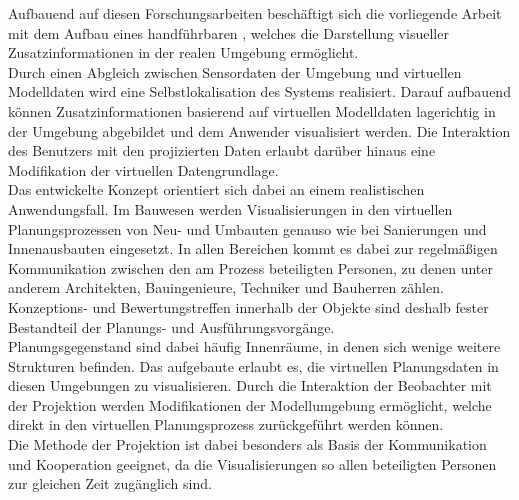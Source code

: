Aufbauend auf diesen Forschungsarbeiten beschäftigt sich die vorliegende Arbeit mit dem Aufbau eines handführbaren , welches die Darstellung visueller Zusatzinformationen in der realen Umgebung ermöglicht.\\
Durch einen Abgleich zwischen Sensordaten der Umgebung und virtuellen Modelldaten wird eine Selbstlokalisation des Systems realisiert. Darauf aufbauend können Zusatzinformationen basierend auf virtuellen Modelldaten lagerichtig in der Umgebung abgebildet und dem Anwender visualisiert werden. Die Interaktion des Benutzers mit den projizierten Daten erlaubt darüber hinaus eine Modifikation der virtuellen Datengrundlage.\\

Das entwickelte Konzept orientiert sich dabei an einem realistischen Anwendungsfall. Im Bauwesen werden Visualisierungen in den virtuellen Planungsprozessen von Neu- und Umbauten genauso wie bei Sanierungen und Innenausbauten eingesetzt. In allen Bereichen kommt es dabei zur regelmäßigen Kommunikation zwischen den am Prozess beteiligten Personen, zu denen unter anderem Architekten, Bauingenieure, Techniker und Bauherren zählen. Konzeptions- und Bewertungstreffen innerhalb der Objekte sind deshalb fester Bestandteil der Planungs- und Ausführungsvorgänge.\\
Planungsgegenstand sind dabei häufig Innenräume, in denen sich wenige weitere Strukturen befinden. Das aufgebaute \kps{} erlaubt es, die virtuellen Planungsdaten in diesen Umgebungen zu visualisieren. Durch die Interaktion der Beobachter mit der Projektion werden Modifikationen der Modellumgebung ermöglicht, welche direkt in den virtuellen Planungsprozess zurückgeführt werden können.\\
Die Methode der Projektion ist dabei besonders als Basis der Kommunikation und Kooperation geeignet, da die Visualisierungen so allen beteiligten Personen zur gleichen Zeit zugänglich sind.\\

